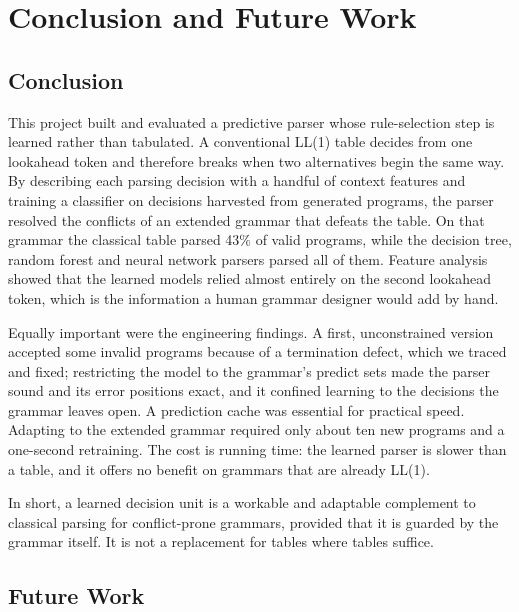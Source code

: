 \documentclass[12pt,a4paper]{article}
\begin{document}
\section{Conclusion and Future Work}

\subsection{Conclusion}

This project built and evaluated a predictive parser whose rule-selection step
is learned rather than tabulated. A conventional LL(1) table decides from one
lookahead token and therefore breaks when two alternatives begin the same way.
By describing each parsing decision with a handful of context features and
training a classifier on decisions harvested from generated programs, the
parser resolved the conflicts of an extended grammar that defeats the table.
On that grammar the classical table parsed 43\% of valid programs, while the
decision tree, random forest and neural network parsers parsed all of them.
Feature analysis showed that the learned models relied almost entirely on the
second lookahead token, which is the information a human grammar designer would
add by hand.

Equally important were the engineering findings. A first, unconstrained version
accepted some invalid programs because of a termination defect, which we
traced and fixed; restricting the model to the grammar's predict sets made the
parser sound and its error positions exact, and it confined learning to the
decisions the grammar leaves open. A prediction cache was essential for
practical speed. Adapting to the extended grammar required only about ten new
programs and a one-second retraining. The cost is running time: the learned
parser is slower than a table, and it offers no benefit on grammars that are
already LL(1).

In short, a learned decision unit is a workable and adaptable complement to
classical parsing for conflict-prone grammars, provided that it is guarded by
the grammar itself. It is not a replacement for tables where tables suffice.

\subsection{Future Work}
\end{document}
